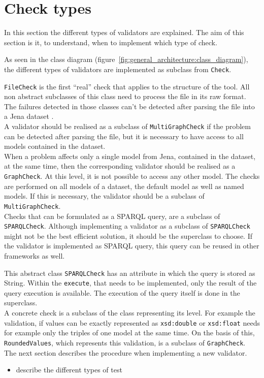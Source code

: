 \documentclass[11pt,a4paper]{article}
\newcommand{\function}[1]{\texttt{#1}}
\newcommand{\class}[1]{\texttt{#1}}
\begin{document}
\section{Check types}
\label{sec:check_types}
%
In this section the different types of validators are explained. 
The aim of this section is it, to understand, when to implement which type of check. 

As seen in the class diagram (figure~\ref{fig:general_architecture:class_diagram}), the different types of validators are implemented as subclass from \class{Check}. 

\class{FileCheck} is the first \enquote{real} check that applies to the structure of the tool. 
All non abstract subclasses of this class need to process the file in its raw format. 
The failures detected in those classes can't be detected after parsing the file into a Jena dataset \cite{apache_jena}. 
\\
A validator should be realised as a subclass of \class{MultiGraphCheck} if the problem can be detected after parsing the file, but it is necessary to have access to all models contained in the dataset. 
\\
When a problem affects only a single model from Jena, contained in the dataset, at the same time, then the corresponding validator should be realised as a \class{GraphCheck}. 
At this level, it is not possible to access any other model. 
The checks are performed on all models of a dataset, the default model as well as named models. 
If this is necessary, the validator should be a subclass of \class{MultiGraphCheck}. 
\\
Checks that can be formulated as a SPARQL query, are a subclass of \class{SPARQLCheck}. 
Although implementing a validator as a subclass of \class{SPARQLCheck} might not be the best efficient solution, it should be the superclass to choose. 
If the validator is implemented as SPARQL query, this query can be reused in other frameworks as well. 

This abstract class \class{SPARQLCheck} has an attribute in which the query is stored as String. 
Within the \function{execute}, that needs to be implemented, only the result of the query execution is available. 
The execution of the query itself is done in the superclass. 
\\
A concrete check is a subclass of the class representing its level. 
For example the validation, if values can be exactly represented as \texttt{xsd:double} or \texttt{xsd:float} needs for example only the triples of one model at the same time. 
On the basis of this, \class{RoundedValues}, which represents this validation, is a subclass of \class{GraphCheck}.  
\\
The next section describes the procedure when implementing a new validator. 
\begin{itemize}
	\item describe the different types of test	
\end{itemize}
%
\end{document}
